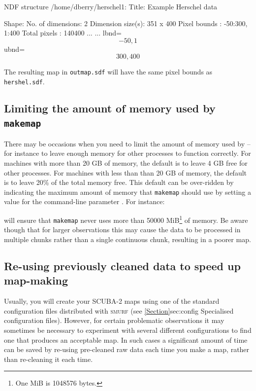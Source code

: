 \begin{terminalv}
\begin{terminalv}

   NDF structure /home/dberry/herschel1:
      Title:  Example Herschel data

   Shape:
      No. of dimensions:  2
      Dimension size(s):  351 x 400
      Pixel bounds     :  -50:300, 1:400
      Total pixels     :  140400
...
...
          lbnd=\[-50,1\] ubnd=\[300,400\]
\end{terminalv}

The resulting map in \texttt{outmap.sdf} will have the same pixel bounds
as \texttt{hershel.sdf}.

\subsection{Limiting the amount of memory used by \texttt{makemap}}
There may be occasions when you need to limit the amount of memory used
by \makemap\---for instance to leave enough memory for other processes
to function correctly. For machines with more than 20 GB of memory, the
default is to leave 4 GB free for other processes. For machines with less
than than 20 GB of memory, the default is to leave 20\% of the total
memory free. This default can be over-ridden by indicating the maximum
amount of memory that \texttt{makemap} should use by setting a value for
the command-line parameter . For instance:

\begin{terminalv}
\end{terminalv}

will ensure that \texttt{makemap} never uses more than 50000
MiB\footnote{One MiB is 1048576 bytes.} of memory. Be aware though that
for larger observations this may cause the data to be processed in
multiple chunks rather than a single continuous chunk, resulting in a
poorer map.

\subsection{Re-using previously cleaned data to speed up map-making}
\label{sec:reuse}

Usually, you will create your SCUBA-2 maps using one of the standard
configuration files distributed with \textsc{smurf} (see
\cref{Section}{sec:config} {Specialised configuration files}). However,
for certain problematic observations it may sometimes be necessary to
experiment with several different configurations to find one that
produces an acceptable map. In such cases a significant amount of time
can be saved by re-using pre-cleaned raw data each time you make a map,
rather than re-cleaning it each time.


\end{terminalv}
